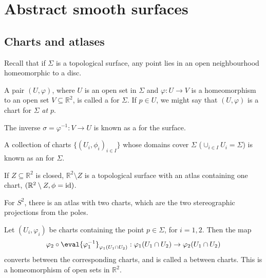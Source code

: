 \section{Abstract smooth surfaces}

\subsection{Charts and atlases}
Recall that if $\Sigma$ is a topological surface, any point lies in an open neighbourhood homeomorphic to a disc.

\begin{definition}[Chart]
	A pair $(U, \varphi)$, where $U$ is an open set in $\Sigma$ and $\varphi \colon U \to V$ is a homeomorphism to an open set $V \subseteq \mathbb R^2$, is called a  for $\Sigma$.
	If $p \in U$, we might say that $(U, \varphi)$ is a chart for $\Sigma$ \textit{at $p$}.
\end{definition}

\begin{definition}
	The inverse $\sigma = \varphi^{-1} \colon V \to U$ is known as a  for the surface.
\end{definition} 

\begin{definition}[Atlas]
	A collection of charts $\{ (U_i, \phi_i)_{i \in I}\}$ whose domains cover $\Sigma$ ($\cup_{i \in I} U_i = \Sigma$) is known as an  for $\Sigma$.
\end{definition} 

\begin{example}
	If $Z \subseteq \mathbb R^2$ is closed, $\mathbb R^2 \setminus Z$ is a topological surface with an atlas containing one chart, $(\mathbb R^2 \setminus Z, \phi = \operatorname{id})$.
\end{example}

\begin{example}
	For $S^2$, there is an atlas with two charts, which are the two stereographic projections from the poles.
\end{example} 

\begin{definition}
	Let $(U_i, \varphi_i)$ be charts containing the point $p \in \Sigma$, for $i = 1, 2$.
	Then the map
	\begin{align*}
		\varphi_2 \circ \eval{\varphi_1^{-1}}_{\varphi_1(U_1 \cap U_2)} : \varphi_1(U_1 \cap U_2) \to \varphi_2(U_1 \cap U_2)
	\end{align*}
	converts between the corresponding charts, and is called a  between charts.
	This is a homeomorphism of open sets in $\mathbb R^2$.
\end{definition}

